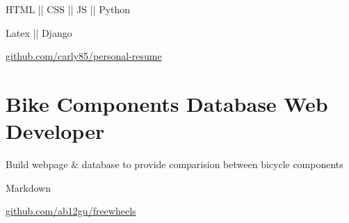 \begin{subtitle}
    \vspace{-5ex}
    {{}} 
\end{subtitle}

\vspace{-1.5ex}
{
    \vspace{-0.8ex}
    \color{cyan}\small
    {HTML || CSS || JS || Python}
}

{
    \vspace{-2.5ex}\hspace{1.5in}
    \color{cyan}\small
    {Latex || Django}
}

{
    \vspace{-2.5ex}\hspace{3in}
    \color{blue}\small
    {\href{https://github.com/carly85/personal-resume}{github.com/carly85/personal-resume}{}}
}

\vspace{2.5ex}


\section{
    \textbf{Bike Components Database} \newline
    Web Developer
}{}

\vspace{-2.5ex}

\begin{detail}
    \BulletItem
    Build webpage \& database to provide comparision between bicycle components
\end{detail}

\begin{subtitle}
    \vspace{-5ex}
    {{}} 
\end{subtitle}

\vspace{-1.5ex}
{
    \vspace{-0.8ex}
    \color{cyan}\small
    {Markdown}
}

{
    \vspace{-2.5ex}\hspace{1.5in}
    \color{cyan}\small
    {}
}

{
    \vspace{-2.5ex}\hspace{3in}
    \color{blue}\small
    {\href{https://github.com/ab12gu/freewheels}{github.com/ab12gu/freewheels}{}}
}

\vspace{2.5ex}